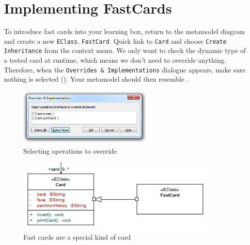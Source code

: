 \newpage
\section{Implementing FastCards}
\genHeader
\hypertarget{fastCard vis}{}

\begin{stepbystep}

\item To introduce fast cards into your learning box, return to the metamodel diagram and create a new \texttt{EClass},
\texttt{FastCard}. Quick link to \texttt{Card} and choose \texttt{Create Inheritance} from the context menu. We only want to check the dynamic type of a
tested card at runtime, which means we don't need to override anything. Therefore, when the \texttt{Overrides \& Implementations} dialogue appears, make sure
nothing is selected (). Your metamodel should then resemble .

\vspace{0.5cm}

\begin{figure}[htp]
\begin{center}
  \includegraphics[width=0.6\textwidth]{../../org.moflon.doc.handbook.03_storyDiagrams/11_fastCards/visFCImages/ea_overrideDialogueModified}
  \caption{Selecting operations to override}  
  \label{ea:dialogue_override}
\end{center}
\end{figure}

\begin{figure}[htp]
\begin{center}
  \includegraphics[width=0.9\textwidth]{../../org.moflon.doc.handbook.03_storyDiagrams/11_fastCards/visFCImages/ea_EClassFastCard}
  \caption{Fast cards are a special kind of card}  
  \label{ea:metamodel_FastCard}
\end{center}
\end{figure}


\end{stepbystep}
